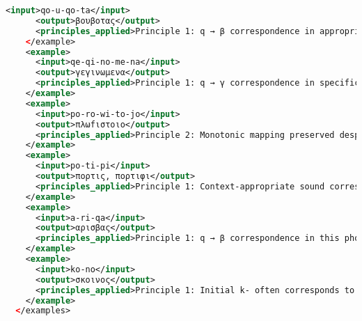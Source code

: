 \begin{lstlisting}[style=mystyle, language=XML, breaklines=true]
      <input>qo-u-qo-ta</input>
      <output>βουβοτας</output>
      <principles_applied>Principle 1: q → β correspondence in appropriate contexts. Principle 2: Preserves monotonic mapping. Principle 4: Diphthong formation patterns (o-u → ου) align with documented cases.</principles_applied>
    </example>
    <example>
      <input>qe-qi-no-me-na</input>
      <output>γεγινωμενα</output>
      <principles_applied>Principle 1: q → γ correspondence in specific environments. Principle 2: Monotonic mapping preserved. Principle 4: Verbal form transformations follow established patterns.</principles_applied>
    </example>
    <example>
      <input>po-ro-wi-to-jo</input>
      <output>πλωfιστοιο</output>
      <principles_applied>Principle 2: Monotonic mapping preserved despite syllable reduction. Principle 3: Maintains structural sparsity. Principle 4: Genitive ending transformation follows documented patterns.</principles_applied>
    </example>
    <example>
      <input>po-ti-pi</input>
      <output>πορτις, πορτιφι</output>
      <principles_applied>Principle 1: Context-appropriate sound correspondences. Principle 3: One-to-one mapping maintained. Principle 4: Case ending transformation follows established patterns.</principles_applied>
    </example>
    <example>
      <input>a-ri-qa</input>
      <output>αρισβας</output>
      <principles_applied>Principle 1: q → β correspondence in this phonetic environment. Principle 2: Monotonic mapping preserved. Principle 4: Consonant addition follows patterns observed in anthroponyms.</principles_applied>
    </example>
    <example>
      <input>ko-no</input>
      <output>σκοινος</output>
      <principles_applied>Principle 1: Initial k- often corresponds to σκ- in Greek. Principle 2: Monotonic mapping preserved with initial consonant addition. Principle 4: Aligns with observed prosthetic consonant patterns.</principles_applied>
    </example>
  </examples>


\end{lstlisting}
